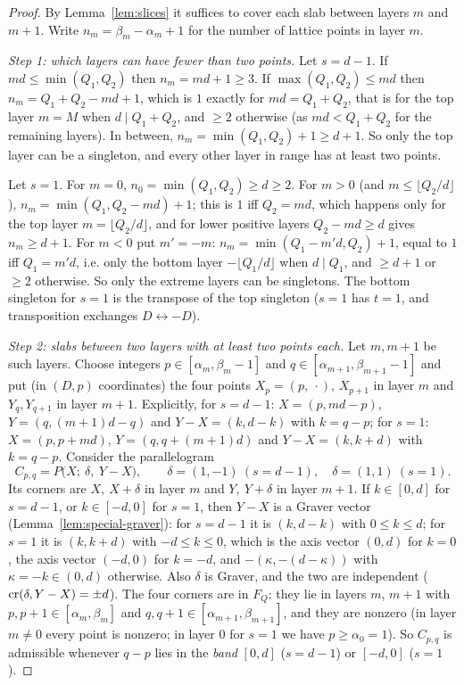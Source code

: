 \begin{proof}
By Lemma~\ref{lem:slices} it suffices to cover each slab between layers $m$ and $m+1$. Write $n_m=\beta_m-\alpha_m+1$ for the number of lattice points in layer $m$.

\emph{Step 1: which layers can have fewer than two points.} Let $s=d-1$. If $md\le\min(Q_1,Q_2)$ then $n_m=md+1\ge3$. If $\max(Q_1,Q_2)\le md$ then $n_m=Q_1+Q_2-md+1$, which is $1$ exactly for $md=Q_1+Q_2$, that is for the top layer $m=M$ when $d\mid Q_1+Q_2$, and $\ge2$ otherwise (as $md<Q_1+Q_2$ for the remaining layers). In between, $n_m=\min(Q_1,Q_2)+1\ge d+1$. So only the top layer can be a singleton, and every other layer in range has at least two points.

Let $s=1$. For $m=0$, $n_0=\min(Q_1,Q_2)\ge d\ge2$. For $m>0$ (and $m\le\lfloor Q_2/d\rfloor$), $n_m=\min(Q_1,Q_2-md)+1$; this is $1$ iff $Q_2=md$, which happens only for the top layer $m=\lfloor Q_2/d\rfloor$, and for lower positive layers $Q_2-md\ge d$ gives $n_m\ge d+1$. For $m<0$ put $m'=-m$: $n_m=\min(Q_1-m'd,Q_2)+1$, equal to $1$ iff $Q_1=m'd$, i.e. only the bottom layer $-\lfloor Q_1/d\rfloor$ when $d\mid Q_1$, and $\ge d+1$ or $\ge2$ otherwise. So only the extreme layers can be singletons. The bottom singleton for $s=1$ is the transpose of the top singleton ($s=1$ has $t=1$, and transposition exchanges $D\leftrightarrow-D$).

\emph{Step 2: slabs between two layers with at least two points each.} Let $m,m+1$ be such layers. Choose integers $p\in[\alpha_m,\beta_m-1]$ and $q\in[\alpha_{m+1},\beta_{m+1}-1]$ and put (in $(D,p)$ coordinates) the four points $X_p=(p,\ \cdot)$, $X_{p+1}$ in layer $m$ and $Y_q,Y_{q+1}$ in layer $m+1$. Explicitly, for $s=d-1$: $X=(p,md-p)$, $Y=(q,(m+1)d-q)$ and $Y-X=(k,d-k)$ with $k=q-p$; for $s=1$: $X=(p,p+md)$, $Y=(q,q+(m+1)d)$ and $Y-X=(k,k+d)$ with $k=q-p$. Consider the parallelogram
\[
  C_{p,q}=P\bigl(X;\ \delta,\ Y-X\bigr),\qquad \delta=(1,-1)\ (s=d-1),\quad\delta=(1,1)\ (s=1).
\]
Its corners are $X,\ X+\delta$ in layer $m$ and $Y,\ Y+\delta$ in layer $m+1$. If $k\in[0,d]$ for $s=d-1$, or $k\in[-d,0]$ for $s=1$, then $Y-X$ is a Graver vector (Lemma~\ref{lem:special-graver}): for $s=d-1$ it is $(k,d-k)$ with $0\le k\le d$; for $s=1$ it is $(k,k+d)$ with $-d\le k\le0$, which is the axis vector $(0,d)$ for $k=0$, the axis vector $(-d,0)$ for $k=-d$, and $-(\kappa,-(d-\kappa))$ with $\kappa=-k\in(0,d)$ otherwise. Also $\delta$ is Graver, and the two are independent ($\operatorname{cr}(\delta,Y-X)=\pm d$). The four corners are in $F_Q$: they lie in layers $m$, $m+1$ with $p,p+1\in[\alpha_m,\beta_m]$ and $q,q+1\in[\alpha_{m+1},\beta_{m+1}]$, and they are nonzero (in layer $m\ne0$ every point is nonzero; in layer $0$ for $s=1$ we have $p\ge\alpha_0=1$). So $C_{p,q}$ is admissible whenever $q-p$ lies in the \emph{band} $[0,d]$ ($s=d-1$) or $[-d,0]$ ($s=1$).


\end{proof}
